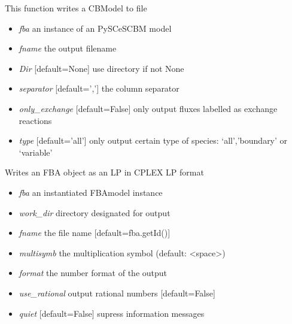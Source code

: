 \documentclass[a4paper,11pt,english]{sphinxmanual}
\begin{document}
\begin{fulllineitems}
\label{modules_doc:cbmpy.CBWrite.writeModelInfoToFile}
This function writes a CBModel to file
\begin{itemize}
\item {} 
\emph{fba} an instance of an PySCeSCBM model

\item {} 
\emph{fname} the output filename

\item {} 
\emph{Dir} {[}default=None{]} use directory if not None

\item {} 
\emph{separator} {[}default=','{]} the column separator

\item {} 
\emph{only\_exchange} {[}default=False{]} only output fluxes labelled as exchange reactions

\item {} 
\emph{type} {[}default='all'{]} only output certain type of species: `all','boundary' or `variable'

\end{itemize}

\end{fulllineitems}


\begin{fulllineitems}
\label{modules_doc:cbmpy.CBWrite.writeModelLP}
Writes an FBA object as an LP in CPLEX LP format
\begin{itemize}
\item {} 
\emph{fba} an instantiated FBAmodel instance

\item {} 
\emph{work\_dir} directory designated for output

\item {} 
\emph{fname} the file name {[}default=fba.getId(){]}

\item {} 
\emph{multisymb} the multiplication symbol (default: \textless{}space\textgreater{})

\item {} 
\emph{format} the number format of the output

\item {} 
\emph{use\_rational} output rational numbers {[}default=False{]}

\item {} 
\emph{quiet} {[}default=False{]} supress information messages

\end{itemize}

\end{fulllineitems}
\end{document}

